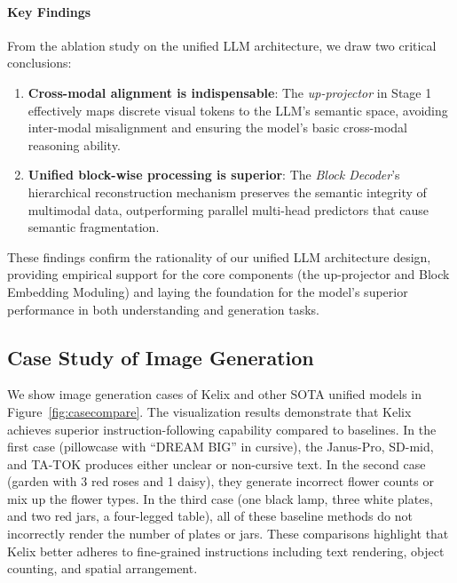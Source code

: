 \documentclass[11pt, a4paper, logo, copyright]{googledeepmind}
\begin{document}
\paragraph{Key Findings}

From the ablation study on the unified LLM architecture, we draw two critical conclusions:

\begin{enumerate}

\item \textbf{Cross-modal alignment is indispensable}: The \textit{up-projector} in Stage 1 effectively maps discrete visual tokens to the LLM's semantic space, avoiding inter-modal misalignment and ensuring the model's basic cross-modal reasoning ability.

\item \textbf{Unified block-wise processing is superior}: The \textit{Block Decoder}'s hierarchical reconstruction mechanism preserves the semantic integrity of multimodal data, outperforming parallel multi-head predictors that cause semantic fragmentation.

\end{enumerate}

These findings confirm the rationality of our unified LLM architecture design, providing empirical support for the core components (the up-projector and Block Embedding Moduling) and laying the foundation for the model's superior performance in both understanding and generation tasks.









\subsection{Case Study of Image Generation}

We show image generation cases of Kelix and other SOTA unified models in Figure~\ref{fig:casecompare}. The visualization results demonstrate that Kelix achieves superior instruction-following capability compared to baselines.
%
In the first case (pillowcase with ``DREAM BIG'' in cursive), the Janus-Pro, SD-mid, and TA-TOK produces either unclear or non-cursive text.
%
In the second case (garden with 3 red roses and 1 daisy), they generate incorrect flower counts or mix up the flower types.
%
In the third case (one black lamp, three white plates, and two red jars, a four-legged table), all of these baseline methods do not incorrectly render the number of plates or jars.
These comparisons highlight that Kelix better adheres to fine-grained instructions including text rendering, object counting, and spatial arrangement.
\end{document}

